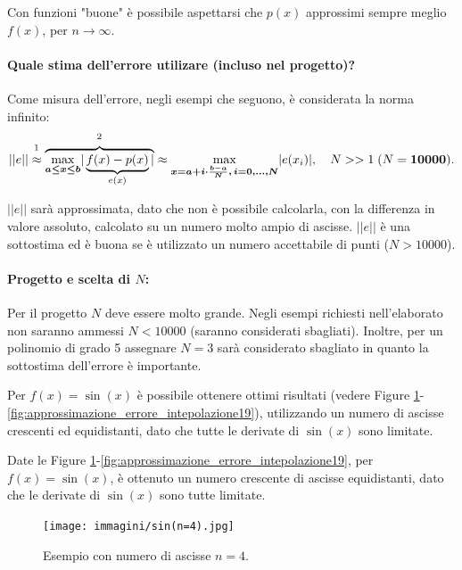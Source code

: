 Con funzioni "buone" è possibile aspettarsi che $p(x)$ approssimi sempre meglio $f(x)$, per $n\rightarrow\infty$.

\paragraph{Quale stima dell'errore utilizare (incluso nel progetto)?}Come misura dell'errore, negli esempi che seguono, è considerata la norma infinito:
\begin{equation*}
    ||e||\overset{\footnotemark}{\approx} \overbrace{\underset{\boldsymbol{a\leq x\leq b}}{\max}|\underbrace{f(x)-p(x)}_{e(x)}|}^{\footnotemark}\approx \underset{\boldsymbol{x=a+i\cdot\frac{b-a}{N},\, i=0,\hdots,N}}{\max}|e(x_i)|,\quad N>>1\; (N=\boldsymbol{10000}).
\end{equation*}
\addtocounter{footnote}{-1}

$||e||$ sarà approssimata, dato che non è possibile calcolarla, con la differenza in valore assoluto, calcolato su un numero molto ampio di ascisse. $||e||$ è una sottostima ed è buona se è utilizzato un numero accettabile di punti ($N>10000$).

\paragraph{Progetto e scelta di $N$:} Per il progetto $N$ deve essere molto grande. Negli esempi richiesti nell'elaborato non saranno ammessi $N<10000$ (saranno considerati sbagliati). Inoltre, per un polinomio di grado 5 assegnare $N=3$ sarà considerato sbagliato in quanto la sottostima dell'errore è importante.

\begin{example}
    Per $f(x)=\sin(x)$ è possibile ottenere ottimi risultati (vedere Figure \ref{fig:approxErrIntepolaz4}-\ref{fig:approssimazione_errore_intepolazione19}), utilizzando un numero di ascisse crescenti ed equidistanti, dato che tutte le derivate di $\sin(x)$ sono limitate.

    Date le Figure \ref{fig:approxErrIntepolaz4}-\ref{fig:approssimazione_errore_intepolazione19}, per $f(x)=\sin(x)$, è ottenuto un numero crescente di ascisse equidistanti, dato che le derivate di $\sin(x)$ sono tutte limitate.
\end{example}

\begin{figure}%
\centering
\texttt{[image: immagini/sin(n=4).jpg]}
\caption{Esempio con numero di ascisse $n=4$.}\label{fig:approxErrIntepolaz4}
\end{figure}

